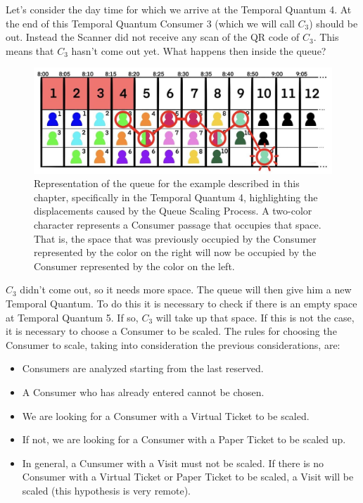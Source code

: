\documentclass[a4paper, 12pt, oneside, table]{article}
\begin{document}
Let's consider the day time for which we arrive at the Temporal Quantum 4. At the end of this Temporal Quantum Consumer 3 (which we will call $ C_3 $) should be out. Instead the Scanner did not receive any scan of the QR code of $ C_3 $. This means that $ C_3 $ hasn't come out yet. What happens then inside the queue?
\begin{figure}[hbt]
\centering
    \centering
    \includegraphics[height=0.15\textheight, scale=0.2, keepaspectratio]{img/queue/queue_ex2.jpg} 
    \caption{Representation of the queue for the example described in this chapter, specifically in the Temporal Quantum 4, highlighting the displacements caused by the Queue Scaling Process. A two-color character represents a Consumer passage that occupies that space. That is, the space that was previously occupied by the Consumer represented by the color on the right will now be occupied by the Consumer represented by the color on the left.}
    \label{queueex2}
\end{figure}
$ C_3 $ didn't come out, so it needs more space. The queue will then give him a new Temporal Quantum. To do this it is necessary to check if there is an empty space at Temporal Quantum 5. If so, $ C_3 $ will take up that space. If this is not the case, it is necessary to choose a Consumer to be scaled. The rules for choosing the Consumer to scale, taking into consideration the previous considerations, are:
\begin{itemize}
    \item Consumers are analyzed starting from the last reserved.
    \item A Consumer who has already entered cannot be chosen.
    \item We are looking for a Consumer with a Virtual Ticket to be scaled.
    \item If not, we are looking for a Consumer with a Paper Ticket to be scaled up.
    \item In general, a Cunsumer with a Visit must not be scaled. If there is no Consumer with a Virtual Ticket or Paper Ticket to be scaled, a Visit will be scaled (this hypothesis is very remote).
\end{itemize}
\end{document}
